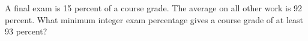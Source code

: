 A final exam is 15 percent of a course grade. The average on all other work is 92 percent. What minimum integer exam percentage gives a course grade of at least 93 percent?
